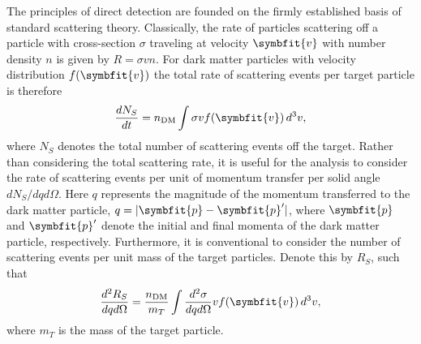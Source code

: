 \documentclass[b5paper, 10pt, twoside]{book}
\renewcommand{\vec}[1]{\symbfit{#1}}
\newcommand{\der}[2]{\frac{d#1}{d#2}}
\newcommand{\ddder}[3]{\frac{d^2#1}{d#2d#3}}
\newcommand{\difd}{\,d}
\begin{document}
The principles of direct detection are founded on the firmly established basis of standard scattering theory. Classically, the rate of particles scattering off a particle with cross-section $\sigma$ traveling at velocity $\vec{v}$ with number density $n$ is given by $R=\sigma vn$. For dark matter particles with velocity distribution $f(\vec{v})$ the total rate of scattering events per target particle is therefore
\begin{equation}
\der{N_S}{t}=n_\text{DM}\int\sigma vf(\vec{v})\difd^3v,
\end{equation}
where $N_S$ denotes the total number of scattering events off the target. Rather than considering the total scattering rate, it is useful for the analysis to consider the rate of scattering events per unit of momentum transfer per solid angle $dN_S/dqd\Omega$. Here $q$ represents the magnitude of the momentum transferred to the dark matter particle, $q=|\vec{p}-\vec{p}'|$, where $\vec{p}$ and $\vec{p}'$ denote the initial and final momenta of the dark matter particle, respectively. Furthermore, it is conventional to consider the number of scattering events per unit mass of the target particles. Denote this by $R_S$, such that
\begin{equation}
\ddder{R_S}{q}{\Omega}=\frac{n_\text{DM}}{m_T}\int\ddder{\sigma}{q}{\Omega}vf(\vec{v})\difd^3{v},
\end{equation}
where $m_T$ is the mass of the target particle.
\end{document}
